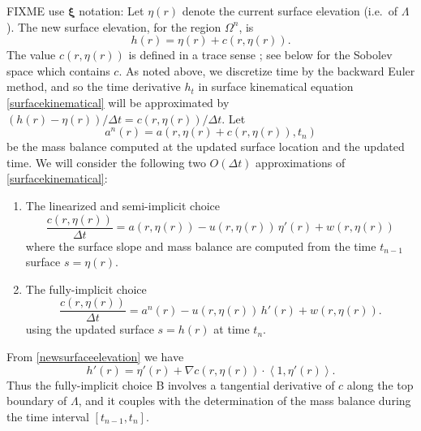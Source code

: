 \documentclass[letterpaper,final,12pt,reqno]{amsart}
\newcommand{\grad}{\nabla}
\newcommand{\bxi}{\bm{\xi}}
\begin{document}
FIXME use $\bxi$ notation: Let $\eta(r)$ denote the current surface elevation (i.e.~of $\Lambda$).  The new surface elevation, for the region $\Omega^n$, is
\begin{equation}
h(r) = \eta(r) + c(r,\eta(r)).  \label{newsurfaceelevation}
\end{equation}
The value $c(r,\eta(r))$ is defined in a trace sense \cite{Evans2010}; see below for the Sobolev space which contains $c$.  As noted above, we discretize time by the backward Euler method, and so the time derivative $h_t$ in surface kinematical equation \eqref{surfacekinematical} will be approximated by $(h(r) - \eta(r))/\Delta t = c(r,\eta(r))/\Delta t$.  Let
\begin{equation}
a^n(r) = a\left(r,\eta(r) + c(r,\eta(r)),t_n\right) \label{massbalance}
\end{equation}
be the mass balance computed at the updated surface location and the updated time.  We will consider the following two $O(\Delta t)$ approximations of \eqref{surfacekinematical}:
\renewcommand{\labelenumi}{\Alph{enumi}.}
\begin{enumerate}
\item The linearized and semi-implicit choice
\begin{equation}
\frac{c(r,\eta(r))}{\Delta t} = a(r,\eta(r)) - u(r,\eta(r))\,\eta'(r) + w(r,\eta(r)) \label{surfacesemiimplicit}
\end{equation}
where the surface slope and mass balance are computed from the time $t_{n-1}$ surface $s=\eta(r)$.
\item The fully-implicit choice
\begin{equation}
\frac{c(r,\eta(r))}{\Delta t} = a^n(r) - u(r,\eta(r))\,h'(r) + w(r,\eta(r)). \label{surfaceimplicit}
\end{equation}
using the updated surface $s=h(r)$ at time $t_n$.
\end{enumerate}
From \eqref{newsurfaceelevation} we have
    $$h'(r) = \eta'(r) + \grad c (r,\eta(r)) \cdot \left<1,\eta'(r)\right>.$$
Thus the fully-implicit choice B involves a tangential derivative of $c$ along the top boundary of $\Lambda$, and it couples with the determination of the mass balance during the time interval $[t_{n-1},t_n]$.
\end{document}
